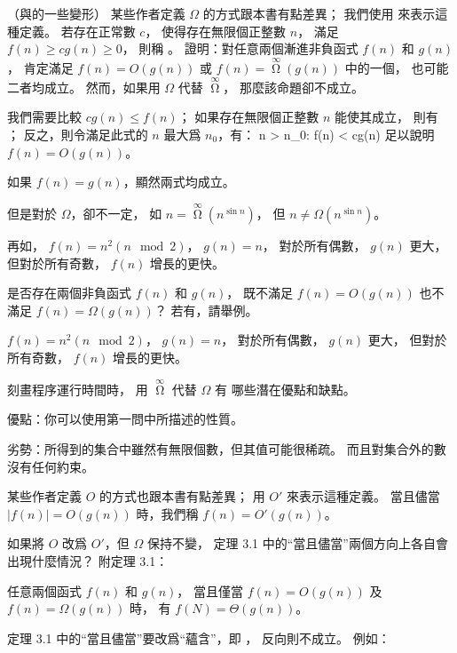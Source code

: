 \startPROBLEM
（與\m{\Omega}的一些變形）
某些作者定義 $\Omega$ 的方式跟本書有點差異；
我們使用 \m{\mathop{\Omega}\limits^{\infty}} 來表示這種定義。
若存在正常數 $c$，
使得存在無限個正整數 $n$，
滿足 $f(n)\ge c g(n)\ge 0$，
則稱 。
\startigBase[a]
\startitem
證明：對任意兩個漸進非負函式 $f(n)$ 和 $g(n)$，
肯定滿足 $f(n) = O(g(n))$ 或 $f(n) = \mathop{\Omega}\limits^{\infty}(g(n))$ 中的一個，
也可能二者均成立。
然而，如果用 $\Omega$ 代替 $\mathop{\Omega}\limits^{\infty}$，
那麼該命題卻不成立。

\startANSWER
我們需要比較 $cg(n) \le f(n)$；
如果存在無限個正整數 $n$ 能使其成立，
則有 \m{\mathop{\Omega}\limits^{\infty}}；
反之，則令滿足此式的 $n$ 最大爲 $n_0$，有：
\startformula
\forall n > n_0: f(n) < cg(n)
\stopformula
足以說明 $f(n) = O(g(n))$。

如果 $f(n) = g(n)$，顯然兩式均成立。

但是對於 $\Omega$，卻不一定，
如 $n = \mathop{\Omega}\limits^{\infty}(n^{\sin{n}})$，
但 $n \ne \Omega(n^{\sin{n}})$。

再如， $f(n)=n^2(n\mod 2)$， $g(n)=n$，
對於所有偶數， $g(n)$ 更大，
但對於所有奇數， $f(n)$ 增長的更快。
\stopANSWER
\stopitem

\startitem
是否存在兩個非負函式 $f(n)$ 和 $g(n)$，
既不滿足 $f(n)=O(g(n))$ 也不滿足 $f(n)=\Omega(g(n))$？
若有，請舉例。

\startANSWER
$f(n)=n^2(n\mod 2)$， $g(n)=n$，
對於所有偶數， $g(n)$ 更大，
但對於所有奇數， $f(n)$ 增長的更快。
\stopANSWER
\stopitem

\startitem
刻畫程序運行時間時，
用 $\mathop{\Omega}\limits^{\infty}$ 代替 $\Omega$ 有
哪些潛在優點和缺點。

\startANSWER
優點：你可以使用第一問中所描述的性質。

劣勢：所得到的集合中雖然有無限個數，但其值可能很稀疏。
而且對集合外的數沒有任何約束。
\stopANSWER
\stopitem

\stopigBase

某些作者定義 $O$ 的方式也跟本書有點差異；
用 $O'$ 來表示這種定義。
當且儘當 $|f(n)| = O(g(n))$ 時，我們稱 $f(n) = O'(g(n))$。

\startigBase[a,continue]
\startitem
如果將 $O$ 改爲 $O'$，但 $\Omega$ 保持不變，
定理 3.1 中的“當且儘當”兩個方向上各自會出現什麼情況？
附定理 3.1：

任意兩個函式 $f(n)$ 和 $g(n)$，
當且僅當 $f(n)=O(g(n))$ 及 $f(n)=\Omega(g(n))$ 時，
有 $f(N)=\Theta(g(n))$。

\startANSWER
定理 3.1 中的“當且儘當”要改爲“蘊含”，即 ，
反向則不成立。
例如：


